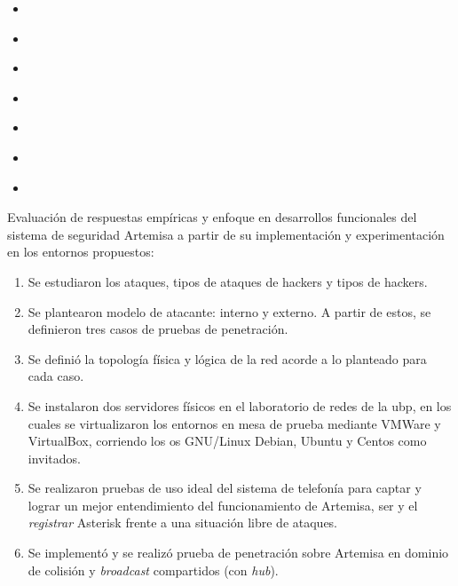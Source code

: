 \documentclass[a4paper,12pt]{report}
\begin{document}
\begin{enumerate}
\begin{itemize}
  \item \cite{docarmof}  

  \item \cite{docarmom}

  \item \cite{ewaldt}

  \item \cite{microsoftsql}

  \item \cite{netfilterneira}

  \item \cite{reingold}

  \item \cite{symantec}

\end{itemize}

{\bf \item Evaluación de respuestas empíricas y enfoque en desarrollos funcionales
del sistema de seguridad Artemisa a partir de
su implementación y experimentación en los entornos propuestos:}

\begin{enumerate}

   \item Se estudiaron los ataques, tipos de ataques de hackers y tipos de
hackers.

  \item Se plantearon modelo de atacante: interno y externo. A partir de estos, se definieron tres 
casos de pruebas de penetración.

  \item Se definió la topología física y lógica de la red acorde a lo planteado para cada caso.

  \item Se instalaron dos servidores físicos en el laboratorio de redes de la \ac{ubp}, en los cuales se
virtualizaron los entornos en mesa de prueba mediante VMWare y Virtual\-Box, corriendo los \ac{os}
GNU/Linux Debian, Ubuntu y Centos como invitados.

  \item Se realizaron pruebas de uso ideal del sistema de telefonía para captar y lograr un mejor
entendimiento del funcionamiento de Artemisa, \ac{ser} y el \emph{registrar} Asterisk frente a una situación libre de
ataques. 

  \item Se implementó y se realizó prueba de penetración sobre Artemisa en dominio de colisión y \emph{broadcast}
compartidos (con \emph{hub}).


\end{enumerate}
\end{enumerate}
\end{document}
